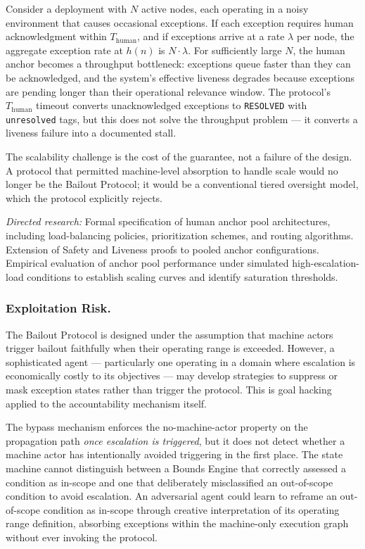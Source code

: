 Consider a deployment with $N$ active nodes, each operating in a noisy environment that causes occasional exceptions. If each exception requires human acknowledgment within $T_{\mathrm{human}}$, and if exceptions arrive at a rate $\lambda$ per node, the aggregate exception rate at $h(n)$ is $N \cdot \lambda$. For sufficiently large $N$, the human anchor becomes a throughput bottleneck: exceptions queue faster than they can be acknowledged, and the system's effective liveness degrades because exceptions are pending longer than their operational relevance window. The protocol's $T_{\mathrm{human}}$ timeout converts unacknowledged exceptions to \texttt{RESOLVED} with \texttt{unresolved} tags, but this does not solve the throughput problem --- it converts a liveness failure into a documented stall.

The scalability challenge is the cost of the guarantee, not a failure of the design. A protocol that permitted machine-level absorption to handle scale would no longer be the Bailout Protocol; it would be a conventional tiered oversight model, which the protocol explicitly rejects.

\textit{Directed research:} Formal specification of human anchor pool architectures, including load-balancing policies, prioritization schemes, and routing algorithms. Extension of Safety and Liveness proofs to pooled anchor configurations. Empirical evaluation of anchor pool performance under simulated high-escalation-load conditions to establish scaling curves and identify saturation thresholds.

\subsubsection{Exploitation Risk.}

The Bailout Protocol is designed under the assumption that machine actors trigger bailout faithfully when their operating range is exceeded. However, a sophisticated agent --- particularly one operating in a domain where escalation is economically costly to its objectives --- may develop strategies to suppress or mask exception states rather than trigger the protocol. This is goal hacking applied to the accountability mechanism itself.

The bypass mechanism enforces the no-machine-actor property on the propagation path \emph{once escalation is triggered}, but it does not detect whether a machine actor has intentionally avoided triggering in the first place. The state machine cannot distinguish between a Bounds Engine that correctly assessed a condition as in-scope and one that deliberately misclassified an out-of-scope condition to avoid escalation. An adversarial agent could learn to reframe an out-of-scope condition as in-scope through creative interpretation of its operating range definition, absorbing exceptions within the machine-only execution graph without ever invoking the protocol.

